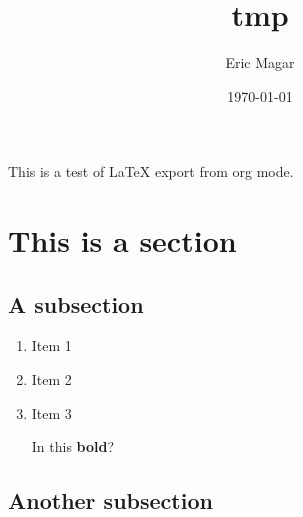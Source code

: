 \documentclass[11pt]{article}
\author{Eric Magar}
\date{\today}
\title{tmp}
\begin{document}
\maketitle
\tableofcontents

This is a test of \LaTeX{} export from org mode. 

\section{This is a section}
\label{sec-1}

\subsection{A subsection}
\label{sec-1-1}

\begin{enumerate}
\item Item 1
\label{sec-1-1-0-0-1}
\item Item 2
\label{sec-1-1-0-0-2}
\item Item 3
\label{sec-1-1-0-0-3}

In this \textbf{bold}?
\end{enumerate}
\subsection{Another subsection}
\label{sec-1-2}
\end{document}
